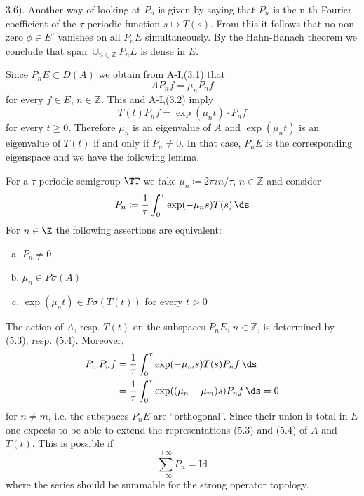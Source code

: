 3.6). Another way of looking at $P_{n}$ is given by saying that $P_{n}$ is the n-th Fourier coefficient of the $\tau$-periodic function $s \mapsto T(s)$.
From this it follows that no non-zero $\phi \in E'$ vanishes on all $P_{n}E$ simultaneously.
By the Hahn-Banach theorem we conclude that $\text{span } \cup_{n \in \mathbb{Z}} P_{n}E$ is dense in $E$.

Since $P_{n}E \subset D(A)$ we obtain from A-I,(3.1) that
\begin{equation}\label{eq:a3-5.3}
AP_{n}f = \mu_{n}P_{n}f
\end{equation}
for every $f \in E$, $n \in \mathbb{Z}$.
This and A-I,(3.2) imply
\begin{equation}\label{eq:a3-5.4}
T(t)P_{n}f = \exp(\mu_{n}t) \cdot P_{n}f
\end{equation}
for every $t \geq 0$.
Therefore $\mu_{n}$ is an eigenvalue of $A$ and $\exp(\mu_{n}t)$ is an eigenvalue of $T(t)$ if and only if $P_{n} \neq 0$.
In that case, $P_{n}E$ is the corresponding eigenspace and we have the following lemma.
\begin{lemma}\label{lem:a3-5.3}

For a $\tau$-periodic semigroup $\TT$ we take $\mu_{n} \coloneqq 2\pi in/\tau$, $n \in \mathbb{Z}$ and consider
\[
P_{n} \coloneqq \frac{1}{\tau}\int_{0}^{\tau} \exp(-\mu_{n}s)T(s) \, \ds
\]
For $n \in \Z$ the following assertions are equivalent:
\begin{enumerate}[(a)]
\item 
$P_{n} \neq 0$

\item 
$\mu_{n} \in P\sigma(A)$

\item 
$\exp(\mu_{n}t) \in P\sigma(T(t))$ for every $t > 0$

\end{enumerate}
\end{lemma}

The action of $A$, resp. $T(t)$ on the subspaces $P_{n}E$, $n \in \mathbb{Z}$, is determined by (5.3), resp. (5.4).
Moreover,
\begin{align*}
P_{m}P_{n}f &=  \frac{1}{\tau}\int_{0}^{\tau} \exp(-\mu_{m}s)T(s)P_{n}f \, \ds \\
&=  \frac{1}{\tau}\int_{0}^{\tau} \exp((\mu_{n}-\mu_{m})s)P_{n}f \, \ds = 0
\end{align*}
for $n \neq m$, i.e. the subspaces $P_{n}E$ are \enquote{orthogonal}.
Since their union is total in $E$ one expects to be able to extend the representations (5.3) and (5.4) of $A$ and $T(t)$.
This is possible if
\[
\sum_{-\infty}^{+\infty} P_{n} = \text{Id}
\]
where the series should be summable for the strong operator topology.


